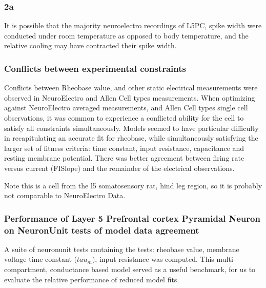 %

\subsubsection{2a}


It is possible that the majority neuroelectro recordings of L5PC, spike width were conducted under room temperature as opposed to body temperature, and the relative cooling may have contracted their spike width.
\cite{goldin2017temperature}

\subsubsection{Conflicts between experimental constraints}

Conflicts between Rheobase value, and other static electrical measurements were observed in NeuroElectro and Allen Cell types measurements. When optimizing against NeuroElectro averaged measurements, and Allen Cell types single cell observations, it was common to experience a conflicted ability for the cell to satisfy all constraints simultaneously. 
Models seemed to have particular difficulty in recapitulating an accurate fit for rheobase, while simultaneously satisfying the larger set of fitness criteria: time constant, input resistance, capacitance and resting membrane potential. There was better agreement between firing rate versus current (FISlope) and the remainder of the electrical observations.

%
Note this is a cell from the l5 somatosensory rat, hind leg region, so it is probably not comparable to NeuroElectro Data.
\subsubsection{Performance of Layer 5 Prefrontal cortex Pyramidal Neuron on NeuronUnit tests of model data agreement}
\cite{van2016bluepyopt}
A suite of neuronunit tests containing the tests: rheobase value, membrane voltage time constant ($tau_{m})$, input resistance was computed. This multi-compartment, conductance based model served as a useful benchmark, for us to evaluate the relative performance of reduced model fits.

